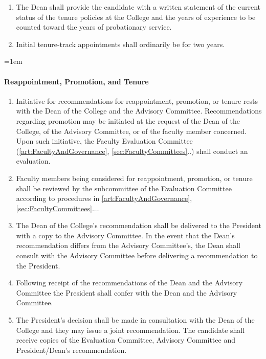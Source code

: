 \documentclass{manual}
\let\oldparagraph\paragraph
\renewcommand\paragraph{\leftskip=1em\oldparagraph}
\newcommand{\itemLevelA}{\alph*.}
\newcommand{\itemRefA}{\alph*}
\begin{document}
\begin{enumerate}[label=\itemLevelA,ref=\itemRefA]
\item The Dean shall provide the candidate with a written statement of the current status of the tenure policies at the College and the years of experience to be counted toward the years of probationary service.

\item Initial tenure-track appointments shall ordinarily be for two years.
\end{enumerate}

\paragraph{Reappointment, Promotion, and Tenure}
\begin{enumerate}[label=\itemLevelA,ref=\itemRefA]

\item Initiative for recommendations for reappointment, promotion, or tenure rests with the Dean of the College and the Advisory Committee. Recommendations regarding promotion may be initiated at the request of the Dean of the College, of the Advisory Committee, or of the faculty member concerned. Upon such initiative, the Faculty Evaluation Committee (\cref{art:FacultyAndGovernance}, \cref{sec:FacultyCommittees}..) shall conduct an evaluation.

\item Faculty members being considered for reappointment, promotion, or tenure shall be reviewed by the subcommittee of the Evaluation Committee according to procedures in \cref{art:FacultyAndGovernance}, \cref{sec:FacultyCommittees}....

\item The Dean of the College's recommendation shall be delivered to the President with a copy to the Advisory Committee. In the event that the Dean's recommendation differs from the Advisory Committee's, the Dean shall consult with the Advisory Committee before delivering a recommendation to the President.

\item Following receipt of the recommendations of the Dean and the Advisory Committee the President shall confer with the Dean and the Advisory Committee.

\item The President's decision shall be made in consultation with the Dean of the College and they may issue a joint recommendation. The candidate shall receive copies of the Evaluation Committee, Advisory Committee and President/Dean's recommendation.
\end{enumerate}
\end{document}

